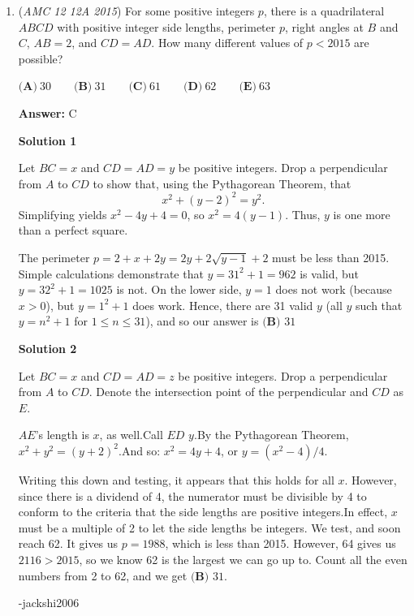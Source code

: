 \begin{enumerate}
 


	\item (\textit{AMC 12 12A 2015}) For some positive integers $p$, there is a quadrilateral $ABCD$ with positive integer side lengths, perimeter $p$, right angles at $B$ and $C$, $AB=2$, and $CD=AD$. How many different values of $p<2015$ are possible?


 $\textbf{(A)}\ 30 \qquad\textbf{(B)}\ 31 \qquad\textbf{(C)}\ 61 \qquad\textbf{(D)}\ 62 \qquad\textbf{(E)}\ 63$

 \textbf{Answer: }C



\textbf{Solution 1}

Let $BC = x$ and $CD = AD = y$ be positive integers. Drop a perpendicular from $A$ to $CD$ to show that, using the Pythagorean Theorem, that
 \[x^2 + (y - 2)^2 = y^2.\]Simplifying yields $x^2 - 4y + 4 = 0$, so $x^2 = 4(y - 1)$. Thus, $y$ is one more than a perfect square.

 The perimeter $p = 2 + x + 2y = 2y + 2\sqrt{y - 1} + 2$ must be less than 2015. Simple calculations demonstrate that $y = 31^2 + 1 = 962$ is valid, but $y = 32^2 + 1 = 1025$ is not. On the lower side, $y = 1$ does not work (because $x > 0$), but $y = 1^2 + 1$ does work. Hence, there are 31 valid $y$ (all $y$ such that $y = n^2 + 1$ for $1 \le n \le 31$), and so our answer is $\boxed{\textbf{(B) } 31}$




\textbf{Solution 2}

Let $BC = x$ and $CD = AD = z$ be positive integers. Drop a perpendicular from $A$ to $CD$. Denote the intersection point of the perpendicular and $CD$ as $E$.

 $AE$'s length is $x$, as well.Call $ED$ $y$.By the Pythagorean Theorem,  $x^2 + y^2 = (y + 2)^2$.And so: $x^2 = 4y + 4$, or $y = (x^2-4)/4$.

 Writing this down and testing, it appears that this holds for all $x$. However, since there is a dividend of 4, the numerator must be divisible by 4 to conform to the criteria that the side lengths are positive integers.In effect, $x$ must be a multiple of 2 to let the side lengths be integers. We test, and soon reach 62. It gives us $p = 1988$, which is less than 2015. However, 64 gives us $2116 > 2015$, so we know 62 is the largest we can go up to. Count all the even numbers from 2 to 62, and we get $\boxed{\textbf{(B) } 31}$.

 -jackshi2006

 




\end{enumerate}
